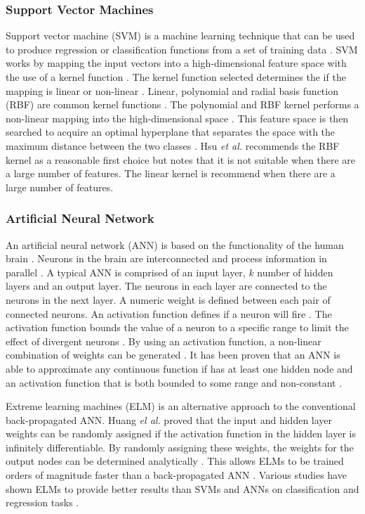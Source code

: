 \documentclass{sig-alternate-05-2015}
\begin{document}
	\subsubsection{Support Vector Machines}
	Support vector machine (SVM) is a machine learning technique that can be used to produce regression or classification functions from a set of training data \cite{Luo20097562}. SVM works by mapping the input vectors into a high-dimensional feature space with the use of a kernel function \cite{Danenas20153194}. The kernel function selected determines the if the mapping is linear or non-linear \cite{Luo20097562}. Linear, polynomial and radial basis function (RBF) are common kernel functions \cite{hsu2003practical}. The polynomial and RBF kernel performs a non-linear mapping into the high-dimensional space \cite{hsu2003practical}. This feature space is then searched to acquire an optimal hyperplane that separates the space with the maximum distance between the two classes \cite{Danenas20153194}. Hsu \textit{et al.} \cite{hsu2003practical} recommends the RBF kernel as a reasonable first choice but notes that it is not suitable when there are a large number of features. The linear kernel is recommend when there are a large number of features.
	
	\subsubsection{Artificial Neural Network}
	An artificial neural network (ANN) is based on the functionality of the human brain \cite{Wang2003}. Neurons in the brain are interconnected and process information in parallel \cite{Wang2003}. A typical ANN is comprised of an input layer, $k$ number of hidden layers and an output layer. The neurons in each layer are connected to the neurons in the next layer. A numeric weight is defined between each pair of connected neurons. An activation function defines if a neuron will fire \cite{Wang2003}. The activation function bounds the value of a neuron to a specific range to limit the effect of divergent neurons \cite{Wang2003}. By using an activation function, a non-linear combination of weights can be generated \cite{Wang2003}. It has been proven that an ANN is able to approximate any continuous function if has at least one hidden node and an activation function that is both bounded to some range and non-constant \cite{Hornik1991251}.
	
	Extreme learning machines (ELM) is an alternative approach to the conventional back-propagated ANN. Huang \textit{el al.} \cite{Huang2006489} proved that the input and hidden layer weights can be randomly assigned if the activation function in the hidden layer is infinitely differentiable. By randomly assigning these weights, the weights for the output nodes can be determined analytically \cite{Huang2006489}. This allows ELMs to be trained orders of magnitude faster than a back-propagated ANN \cite{Huang2006489} \cite{6035797}. Various studies have shown ELMs to provide better results than SVMs and ANNs on classification and regression tasks \cite{Huang2006489} \cite{6035797}.
	
\end{document}
